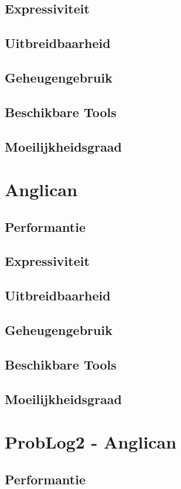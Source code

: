 \documentclass[12pt,a4paper,oneside]{book}
\theoremstyle{definition}
\begin{document}
\subsection{Expressiviteit}
\subsection{Uitbreidbaarheid}
\subsection{Geheugengebruik}
\subsection{Beschikbare Tools}
\subsection{Moeilijkheidsgraad}
\section{Anglican}
\label{sec:evaluatieAnglican}
\subsection{Performantie}
\subsection{Expressiviteit}
\subsection{Uitbreidbaarheid}
\subsection{Geheugengebruik}
\subsection{Beschikbare Tools}
\subsection{Moeilijkheidsgraad}
\section{ProbLog2 - Anglican}
\label{sec:evaluatieProbLog2Anglican}
\subsection{Performantie}
\end{document}
